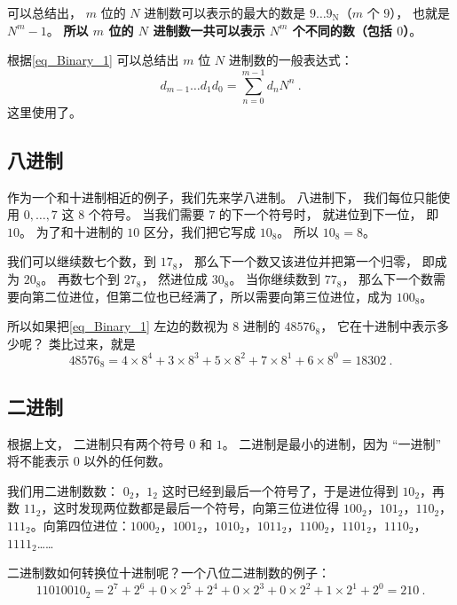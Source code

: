 可以总结出， $m$ 位的 $N$ 进制数可以表示的最大的数是 $9\dots9_\text{N}$（$m$ 个 $9$）， 也就是 $N^m-1$。 \textbf{所以 $m$ 位的 $N$ 进制数一共可以表示 $N^m$ 个不同的数（包括 $0$）}。

根据\autoref{eq_Binary_1} 可以总结出 $m$ 位 $N$ 进制数的一般表达式：
\begin{equation}\label{eq_Binary_2}
d_{m-1}\dots d_1d_0 = \sum_{n=0}^{m-1} d_n N^n~.
\end{equation}
这里使用了。

\subsection{八进制}
作为一个和十进制相近的例子，我们先来学八进制。 八进制下， 我们每位只能使用 $0,\dots,7$ 这 $8$ 个符号。 当我们需要 $7$ 的下一个符号时， 就进位到下一位， 即 $10$。 为了和十进制的 $10$ 区分，我们把它写成 $10_\text{8}$。 所以 $10_\text{8} = 8$。

我们可以继续数七个数，到 $17_\text{8}$， 那么下一个数又该进位并把第一个归零， 即成为 $20_\text{8}$。 再数七个到 $27_\text{8}$， 然进位成 $30_\text{8}$。 当你继续数到 $77_\text{8}$， 那么下一个数需要向第二位进位，但第二位也已经满了，所以需要向第三位进位，成为 $100_\text{8}$。

所以如果把\autoref{eq_Binary_1} 左边的数视为 $8$ 进制的 $48576_\text{8}$， 它在十进制中表示多少呢？ 类比过来，就是
\begin{equation}
48576_\text{8} = 4\times 8^{4} + 3\times 8^{3} + 5\times 8^{2} + 7\times 8^1 + 6\times 8^0 = 18302~.
\end{equation}

\subsection{二进制}
根据上文， 二进制只有两个符号 $0$ 和 $1$。 二进制是最小的进制，因为 “一进制” 将不能表示 $0$ 以外的任何数。

我们用二进制数数： $0_\text{2}$，$1_\text{2}$ 这时已经到最后一个符号了，于是进位得到 $10_\text{2}$，再数 $11_\text{2}$，这时发现两位数都是最后一个符号，向第三位进位得 $100_\text{2}$，$101_\text{2}$，$110_\text{2}$，$111_\text{2}$。向第四位进位：$1000_\text{2}$，$1001_\text{2}$，$1010_\text{2}$，$1011_\text{2}$，$1100_\text{2}$，$1101_\text{2}$，$1110_\text{2}$，$1111_\text{2}$……

二进制数如何转换位十进制呢？一个八位二进制数的例子：
\begin{equation}
11010010_\text{2} = 2^7 + 2^6 + 0\times 2^5 + 2^4 + 0\times 2^3 + 0 \times 2^2 + 1\times 2^1 + 2^0 = 210~.
\end{equation}

